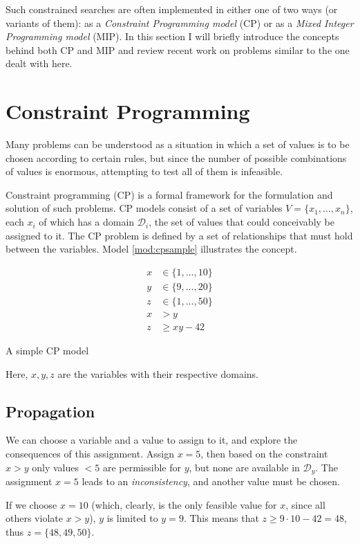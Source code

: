\documentclass[13pt, letterpaper, oneside]{book}
\begin{document}
Such constrained searches are often implemented in either one of two ways (or
variants of them): as a \textit{Constraint Programming model} (CP) or as a
\textit{Mixed Integer Programming model} (MIP). In this section I will briefly
introduce the concepts behind both CP and MIP and review recent work on problems
similar to the one dealt with here.

\section{Constraint Programming}
\label{sec:backgroundcp}
Many problems can be understood as a situation in which a set of values is to be
chosen according to certain rules, but since the number of possible combinations
of values is enormous, attempting to test all of them is infeasible.


Constraint programming (CP) is a formal framework for the formulation and
solution of such problems. CP models consist of a set of variables $V = \{x_1,
\dots, x_n\}$, each $x_i$ of which has a domain $\mathcal{D}_i$, the set of
values that could conceivably be assigned to it. The CP problem is defined by a
set of relationships that must hold between the variables. Model
\ref{mod:cpsample} illustrates the concept.

\begin{model}
\begin{align}
x &\in \{1,\dots,10\}\\
y &\in \{9,\dots,20\}\\
z &\in \{1,\dots,50\}\\
x &> y\\
z &\geq xy - 42
\end{align}
\caption{A simple CP model}
\label{mod:cpsample}
\end{model}
Here, $x, y, z$ are the variables with their respective domains.

\subsection{Propagation}
We can choose a variable and a value to assign to it, and explore the
consequences of this assignment. Assign $x = 5$, then based on the constraint $x
> y$ only values $< 5$ are permissible for $y$, but none are available in
$\mathcal{D}_y$. The assignment $x = 5$ leads to an \textit{inconsistency}, and
another value must be chosen.
 
If we choose $x = 10$ (which, clearly, is the only feasible value for $x$, since all
others violate $x > y$), $y$ is limited to $y = 9$. This means that $z \geq 9 \cdot
10 - 42 = 48$, thus $z = \{48, 49, 50\}$.
 
\end{document}
